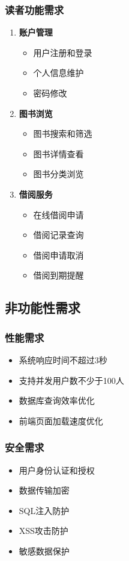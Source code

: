 \documentclass[12pt,a4paper]{article}
\begin{document}
\subsubsection{读者功能需求}
\begin{enumerate}
    \item \textbf{账户管理}
    \begin{itemize}
        \item 用户注册和登录
        \item 个人信息维护
        \item 密码修改
    \end{itemize}
    
    \item \textbf{图书浏览}
    \begin{itemize}
        \item 图书搜索和筛选
        \item 图书详情查看
        \item 图书分类浏览
    \end{itemize}
    
    \item \textbf{借阅服务}
    \begin{itemize}
        \item 在线借阅申请
        \item 借阅记录查询
        \item 借阅申请取消
        \item 借阅到期提醒
    \end{itemize}
\end{enumerate}

\subsection{非功能性需求}

\subsubsection{性能需求}
\begin{itemize}
    \item 系统响应时间不超过3秒
    \item 支持并发用户数不少于100人
    \item 数据库查询效率优化
    \item 前端页面加载速度优化
\end{itemize}

\subsubsection{安全需求}
\begin{itemize}
    \item 用户身份认证和授权
    \item 数据传输加密
    \item SQL注入防护
    \item XSS攻击防护
    \item 敏感数据保护
\end{itemize}
\end{document}
